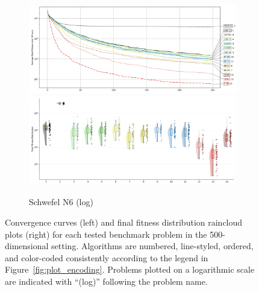 \begin{figure}[p]
\begin{subfigure}{1\textwidth}
    \centering
    \includegraphics[width=.49\textwidth]{Figures/results/500/Schwefel_N6_All_selected_algorithms_dim500_annot_legend.png}
    \includegraphics[width=.49\textwidth]{Figures/results/500/Schwefel_N6_all_dim500_raincloud_vertical.png}
    \caption{Schwefel N6 (log)}
\end{subfigure}


\captionsetup{list=no}
\caption[Convergence curves and final fitness distribution raincloud plots for 500-dimensional problems]{Convergence curves (left) and final fitness distribution raincloud plots (right) for each tested benchmark problem in the 500-dimensional setting. Algorithms are numbered, line-styled, ordered, and color-coded consistently according to the legend in Figure~\ref{fig:plot_encoding}. Problems plotted on a logarithmic scale are indicated with ``(log)'' following the problem name.}
\end{figure}





